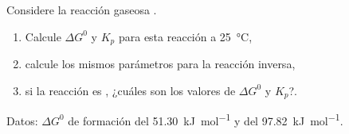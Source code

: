 Considere la reacción gaseosa .
\begin{enumerate}[label={\alph*)},font=\bfseries]
	\item Calcule $\Delta G^0$ y $K_p$ para esta reacción a \SI{25}{\celsius},
	\item calcule los mismos parámetros para la reacción inversa,
	\item si la reacción es , ¿cuáles son los valores de $\Delta G^0$ y $K_p$?.
\end{enumerate}
Datos: $\Delta G^0$ de formación del  \SI{51,30}{\kilo\joule\per\mol} y del  \SI{97,82}{\kilo\joule\per\mol}.
